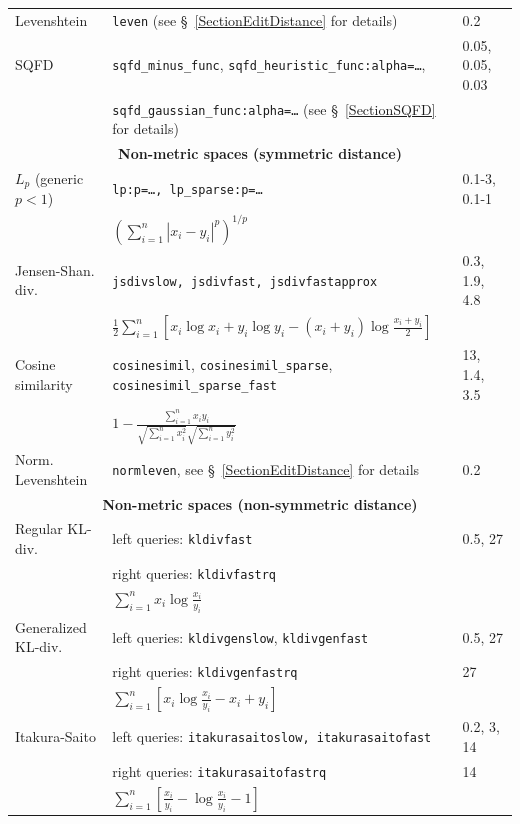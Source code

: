 \documentclass[runningheads,a4paper]{llncs}
\newcommand{\ttt}[1]{\texttt{#1}}
\begin{document}
{\begin{table}
\begin{tabular}{l@{\hspace{2mm}}l@{\hspace{2mm}}l}
\cmidrule(l){1-3} 
Levenshtein       &\ttt{leven} (see \S~\ref{SectionEditDistance} for details) & 0.2 \\
\cmidrule(l){1-3} 
SQFD              & \ttt{sqfd\_minus\_func}, \ttt{sqfd\_heuristic\_func:alpha=\ldots}, & 0.05, 0.05, 0.03 \\
                  &  \ttt{sqfd\_gaussian\_func:alpha=\ldots} (see \S~\ref{SectionSQFD} for details) & \\
\toprule
\multicolumn{3}{c}{\textbf{Non-metric spaces (symmetric distance)}}  \\
\toprule
$L_p$ (generic $p < 1$)& \ttt{lp:p=\ldots, lp\_sparse:p=\ldots}                     &  0.1-3, 0.1-1 \\
                              & $\left(\sum_{i=1}^n |x_i-y_i|^p\right)^{1/p}$  &   \\
\cmidrule(l){1-3} 
Jensen-Shan. div. &\ttt{jsdivslow, jsdivfast, jsdivfastapprox} &   0.3, 1.9, 4.8 \\
                          & $\frac{1}{2}\sum_{i=1}^n \left[x_i \log x_i + y_i \log y_i  - (x_i+y_i)\log \frac{x_i +y_i}{2}\right]$ & \\
\cmidrule(l){1-3} 
Cosine similarity & \ttt{cosinesimil}, \ttt{cosinesimil\_sparse}, \ttt{cosinesimil\_sparse\_fast} & { 13, 1.4, 3.5 } \\
                        & $1-\frac{\sum_{i=1}^n x_i y_i}{\sqrt{\sum_{i=1}^n x_i^2}\sqrt{\sum_{i=1}^n y_i^2 }}$   & \vspace{1em} \\
\cmidrule(l){1-3} 
Norm. Levenshtein       &\ttt{normleven}, see \S~\ref{SectionEditDistance} for details & 0.2 \\
\toprule
\multicolumn{3}{c}{\textbf{Non-metric spaces (non-symmetric distance)}}  \\
\toprule
Regular KL-div. & left queries: \ttt{kldivfast}       & 0.5, 27 \\
                       & right queries: \ttt{kldivfastrq}    &  \\
                       & $\sum_{i=1}^n   x_i \log \frac{x_i}{y_i}$  & \\ 
\cmidrule(l){1-3} 
Generalized KL-div. & left queries: \ttt{kldivgenslow}, \ttt{kldivgenfast} & 0.5, 27    \\
                           & right queries: \ttt{kldivgenfastrq} & 27    \\
                           & $\sum_{i=1}^n \left[  x_i \log \frac{x_i}{y_i} -   x_i +   y_i \right]$   &   \\
\cmidrule(l){1-3} 
Itakura-Saito & left queries: \ttt{itakurasaitoslow, itakurasaitofast}   & 0.2, 3, 14 \\
              & right queries: \ttt{itakurasaitofastrq}                  & 14         \\
              & $\sum_{i=1}^n \left[ \frac{ x_i}{y_i} - \log \frac{x_i}{y_i}  -1 \right]$ \\
\toprule
\end{tabular}
\end{table}

}
\end{document}
